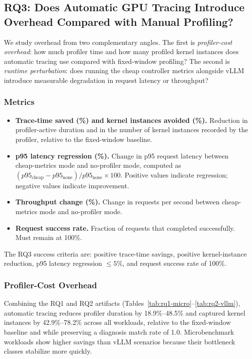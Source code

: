 \subsection{RQ3: Does Automatic GPU Tracing Introduce Overhead Compared with Manual Profiling?}

We study overhead from two complementary angles. The first is \emph{profiler-cost overhead}: how much profiler time and how many profiled kernel instances does automatic tracing use compared with fixed-window profiling? The second is \emph{runtime perturbation}: does running the cheap controller metrics alongside vLLM introduce measurable degradation in request latency or throughput?

\subsubsection{Metrics}

\begin{itemize}
  \item \textbf{Trace-time saved (\%) and kernel instances avoided (\%).}
    Reduction in profiler-active duration and in the number of kernel instances recorded by the profiler, relative to the fixed-window baseline.
  \item \textbf{p95 latency regression (\%).}
    Change in p95 request latency between cheap-metrics mode and no-profiler mode, computed as $(p95_{\text{cheap}} - p95_{\text{none}}) / p95_{\text{none}} \times 100$. Positive values indicate regression; negative values indicate improvement.
  \item \textbf{Throughput change (\%).}
    Change in requests per second between cheap-metrics mode and no-profiler mode.
  \item \textbf{Request success rate.}
    Fraction of requests that completed successfully. Must remain at 100\%.
\end{itemize}

The RQ3 success criteria are: positive trace-time savings, positive kernel-instance reduction, p95 latency regression $\leq 5\%$, and request success rate of 100\%.

\subsubsection{Profiler-Cost Overhead}

Combining the RQ1 and RQ2 artifacts (Tables~\ref{tab:rq1-micro}--\ref{tab:rq2-vllm}), automatic tracing reduces profiler duration by 18.9\%--48.5\% and captured kernel instances by 42.9\%--78.2\% across all workloads, relative to the fixed-window baseline and while preserving a diagnosis match rate of 1.0. Microbenchmark workloads show higher savings than vLLM scenarios because their bottleneck classes stabilize more quickly.

